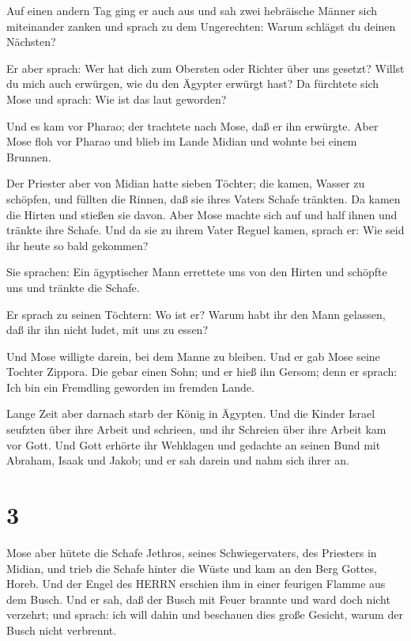  Auf einen andern Tag ging er auch aus und sah zwei
hebräische Männer sich miteinander zanken und sprach zu dem Ungerechten:
Warum schlägst du deinen Nächsten?

 Er aber sprach: Wer hat dich zum Obersten oder Richter
über uns gesetzt? Willst du mich auch erwürgen, wie du den Ägypter
erwürgt hast? Da fürchtete sich Mose und sprach: Wie ist das laut
geworden?

 Und es kam vor Pharao; der trachtete nach Mose, daß er ihn
erwürgte. Aber Mose floh vor Pharao und blieb im Lande Midian und wohnte
bei einem Brunnen.

 Der Priester aber von Midian hatte sieben Töchter; die
kamen, Wasser zu schöpfen, und füllten die Rinnen, daß sie ihres Vaters
Schafe tränkten.  Da kamen die Hirten und stießen sie
davon. Aber Mose machte sich auf und half ihnen und tränkte ihre Schafe.
 Und da sie zu ihrem Vater Reguel kamen, sprach er: Wie
seid ihr heute so bald gekommen?

 Sie sprachen: Ein ägyptischer Mann errettete uns von den
Hirten und schöpfte uns und tränkte die Schafe.

 Er sprach zu seinen Töchtern: Wo ist er? Warum habt ihr
den Mann gelassen, daß ihr ihn nicht ludet, mit uns zu essen?

 Und Mose willigte darein, bei dem Manne zu bleiben. Und er
gab Mose seine Tochter Zippora.  Die gebar einen Sohn; und
er hieß ihn Gersom; denn er sprach: Ich bin ein Fremdling geworden im
fremden Lande.

 Lange Zeit aber darnach starb der König in Ägypten. Und
die Kinder Israel seufzten über ihre Arbeit und schrieen, und ihr
Schreien über ihre Arbeit kam vor Gott.  Und Gott erhörte
ihr Wehklagen und gedachte an seinen Bund mit Abraham, Isaak und Jakob;
 und er sah darein und nahm sich ihrer an.

\hypertarget{section-2}{%
\section{3}\label{section-2}}

 Mose aber hütete die Schafe Jethros, seines
Schwiegervaters, des Priesters in Midian, und trieb die Schafe hinter
die Wüste und kam an den Berg Gottes, Horeb.  Und der Engel
des HERRN erschien ihm in einer feurigen Flamme aus dem Busch. Und er
sah, daß der Busch mit Feuer brannte und ward doch nicht verzehrt;
 und sprach: ich will dahin und beschauen dies große
Gesicht, warum der Busch nicht verbrennt.

